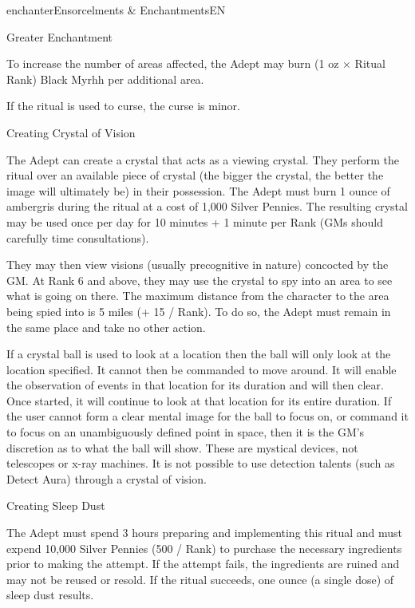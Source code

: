 \begin{College}[1.1]{enchanter}{Ensorcelments \& Enchantments}{EN}
\begin{ritual}[Q-1]{Greater Enchantment}
\begin{effects}
To increase the number of areas affected, the Adept may burn (1 oz ×
Ritual Rank) Black Myrhh per additional area.

If the ritual is used to curse, the curse is minor.
\end{effects}
\end{ritual}

\begin{ritual}[Q-2]{Creating Crystal of Vision}

\begin{effects}
The Adept can create a crystal that acts as a viewing crystal.  They
perform the ritual over an available piece of crystal (the bigger the
crystal, the better the image will ultimately be) in their possession.
The Adept must burn 1 ounce of ambergris during the ritual at a cost
of 1,000 Silver Pennies.  The resulting crystal may be used once per
day for 10 minutes + 1 minute per Rank (GMs should carefully time
consultations).

They may then view visions (usually precognitive in nature) concocted
by the GM.  At Rank 6 and above, they may use the crystal to spy into
an area to see what is going on there.  The maximum distance from the
character to the area being spied into is 5 miles (+ 15 / Rank). To do
so, the Adept must remain in the same place and take no other action.

If a crystal ball is used to look at a location then the ball will
only look at the location specified.  It cannot then be commanded to
move around. It will enable the observation of events in that location
for its duration and will then clear. Once started, it will continue
to look at that location for its entire duration.  If the user cannot
form a clear mental image for the ball to focus on, or command it to
focus on an unambiguously defined point in space, then it is the GM’s
discretion as to what the ball will show.  These are mystical devices,
not telescopes or x-ray machines. It is not possible to use detection
talents (such as Detect Aura) through a crystal of vision.
\end{effects}
\end{ritual}

\begin{ritual}[Q-3]{Creating Sleep Dust}

\begin{effects}
The Adept must spend 3 hours preparing and implementing this ritual
and must expend 10,000 Silver Pennies (500 / Rank) to purchase the
necessary ingredients prior to making the attempt.  If the attempt
fails, the ingredients are ruined and may not be reused or resold. If
the ritual succeeds, one ounce (a single dose) of sleep dust results.


\end{effects}
\end{ritual}
\end{College}
